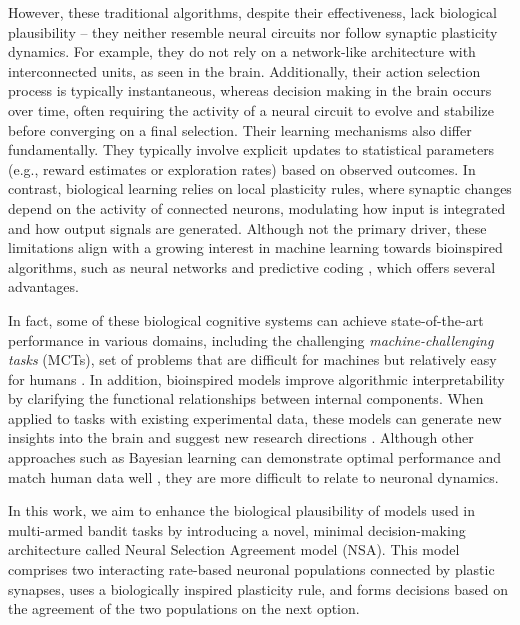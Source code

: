 However, these traditional algorithms, despite their effectiveness, lack biological plausibility – they neither resemble neural circuits nor follow synaptic plasticity dynamics.
For example, they do not rely on a network-like architecture with interconnected units, as seen in the brain.
Additionally, their action selection process is typically instantaneous, whereas decision making in the brain occurs over time, often requiring the activity of a neural circuit to evolve and stabilize before converging on a final selection.
Their learning mechanisms also differ fundamentally. They typically involve explicit updates to statistical parameters (e.g., reward estimates or exploration rates) based on observed outcomes.
In contrast, biological learning relies on local plasticity rules, where synaptic changes depend on the activity of connected neurons, modulating how input is integrated and how output signals are generated.
Although not the primary driver, these limitations align with a growing interest in machine learning towards bioinspired algorithms, such as neural networks and predictive coding \cite{leeBraininspiredPredictiveCoding2022, spratlingReviewPredictiveCoding2017}, which offers several advantages.

In fact, some of these biological cognitive systems can achieve state-of-the-art performance in various domains, including the challenging \textit{machine-challenging tasks} (MCTs), set of problems that are difficult for machines but relatively easy for humans \cite{schmidgallBraininspiredLearningArtificial2024, hassabisNeuroscienceInspiredArtificialIntelligence2017, leeBraininspiredPredictiveCoding2022}.
In addition, bioinspired models improve algorithmic interpretability by clarifying the functional relationships between internal components.
When applied to tasks with existing experimental data, these models can generate new insights into the brain and suggest new research directions \cite{liuSeeingBelievingBrainInspired2023}.
Although other approaches such as Bayesian learning can demonstrate optimal performance and match human data well \cite{behrensLearningValueInformation2007}, they are more difficult to relate to neuronal dynamics.

\hfill \break

\indent In this work, we aim to enhance the biological plausibility of models used in multi-armed bandit tasks by introducing a novel, minimal decision-making architecture called Neural Selection Agreement model (NSA).
This model comprises two interacting rate-based neuronal populations connected by plastic synapses, uses a biologically inspired plasticity rule, and forms decisions based on the agreement of the two populations on the next option.

